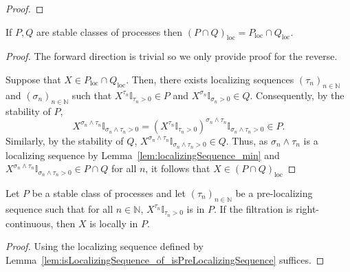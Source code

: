 \begin{proof}\leanok

\end{proof}


\begin{lemma}\label{lem:locally_inter}
  \leanok
If $P, Q$ are stable classes of processes then $(P\cap Q)_{\mathrm{loc}} = P_{\mathrm{loc}}\cap Q_{\mathrm{loc}}$.
\end{lemma}

\begin{proof}\leanok
The forward direction is trivial so we only provide proof for the reverse.

Suppose that $X \in P_{\mathrm{loc}}\cap Q_{\mathrm{loc}}$. Then, there exists localizing sequences $(\tau_n)_{n \in \mathbb{N}}$ and $(\sigma_n)_{n \in \mathbb{N}}$ such that $X^{\tau_n} \mathbb{I}_{\tau_n > 0}\in P$ and $X^{\sigma_n} \mathbb{I}_{\sigma_n > 0} \in Q$. Consequently, by the stability of $P$,
\[X^{\sigma_n \wedge \tau_n} \mathbb{I}_{\sigma_n \wedge \tau_n > 0} = (X^{\tau_n} \mathbb{I}_{\tau_n > 0})^{\sigma_n \wedge \tau_n} \mathbb{I}_{\sigma_n \wedge \tau_n > 0} \in P.\]
Similarly, by the stability of $Q$, $X^{\sigma_n \wedge \tau_n} \mathbb{I}_{\sigma_n \wedge \tau_n > 0} \in Q$. Thus, as $\sigma_n \wedge \tau_n$ is a localizing sequence by Lemma~\ref{lem:localizingSequence_min} and $X^{\sigma_n \wedge \tau_n} \mathbb{I}_{\sigma_n \wedge \tau_n > 0} \in P \cap Q$ for all $n$, it follows that $X \in (P \cap Q)_{\mathrm{loc}}$
\end{proof}


\begin{lemma}\label{lem:locally_of_isPreLocalizingSequence}
  \leanok
Let $P$ be a stable class of processes and let $(\tau_n)_{n \in \mathbb{N}}$ be a pre-localizing sequence such that for all $n \in \mathbb{N}$, $X^{\tau_n}\mathbb{I}_{\tau_n > 0}$ is in $P$.
If the filtration is right-continuous, then $X$ is locally in $P$.
\end{lemma}

\begin{proof}\leanok
  Using the localizing sequence defined by Lemma~\ref{lem:isLocalizingSequence_of_isPreLocalizingSequence} suffices.
\end{proof}


